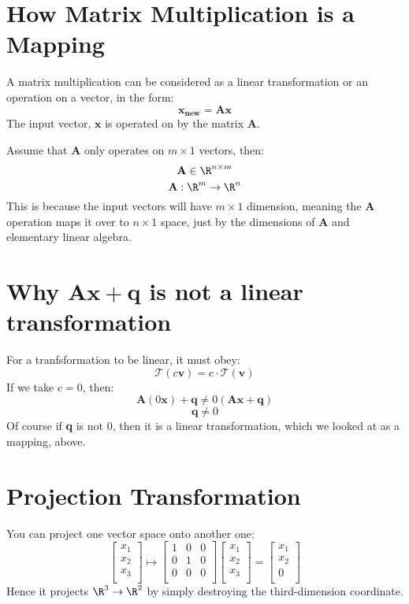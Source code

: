\documentclass{article}
\author{Alex Hiller}
\title{}
\begin{document}
\maketitle
\section{How Matrix Multiplication is a Mapping} 
A matrix multiplication can be considered as a linear transformation or an
operation on a vector, in the form:
\[%
    \mathbf{x_{new} } = \mathbf{A}\mathbf{x}
\]%
The input vector, $ \mathbf{x} $ is operated on by the matrix $ \mathbf{A} $.

Assume that $ \mathbf{A} $ only operates on $ m \times 1 $ vectors, then:
\[%
    \mathbf{A} \in \R^{n \times m}
\]%
\[%
    \mathbf{A}: \R^{m} \rightarrow \R^{n}
\]%
This is because the input vectors will have $ m \times 1 $ dimension, meaning
the $ \mathbf{A} $ operation maps it over to $ n \times 1 $ space, just by the
dimensions of $ \mathbf{A} $ and elementary linear algebra.

\section{Why $ \mathbf{A}\mathbf{x}+\mathbf{q} $ is not a linear
transformation}
For a tranfsformation to be linear, it must obey:
\[%
    \mathcal{T}(c \mathbf{v}) = c \cdot \mathcal{T}(\mathbf{v})
\]%
If we take $ c=0 $, then:
\[%
    \mathbf{A}\left(0 \mathbf{x}\right)+ \mathbf{q} \neq 0
    \left(\mathbf{A}\mathbf{x}+\mathbf{q}\right)
\]%
\[%
    \mathbf{q} \neq 0
\]%
Of course if \textbf{q} is not 0, then it is a linear transformation, which we
looked at as a mapping, above.

\section{Projection Transformation} 
You can project one vector space onto another one:
\[%
    \begin{bmatrix}
        x_1 \\
		x_2 \\
		x_3 \\		
    \end{bmatrix}
    \mapsto 
    \begin{bmatrix}
        1 & 0 & 0 \\
		0 & 1 & 0 \\
		0 & 0 & 0 \\		
    \end{bmatrix}
    \begin{bmatrix}
        x_1 \\
		x_2 \\
		x_3 \\		
    \end{bmatrix}
    = 
    \begin{bmatrix}
        x_1 \\
		x_2 \\
		0 \\		
    \end{bmatrix}
\]%
Hence it projects $ \R^{3}\rightarrow \R^{2} $ by simply destroying the
third-dimension coordinate.
\end{document}
